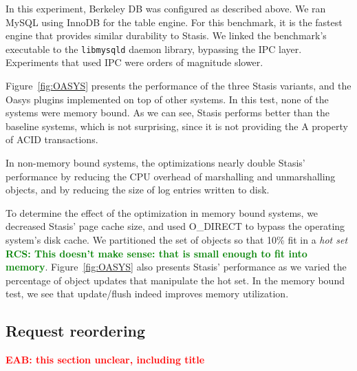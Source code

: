 \documentclass[letterpaper,twocolumn,10pt]{article}
\newcommand{\yad}{Stasis\xspace}
\newcommand{\yads}{Stasis'\xspace}
\newcommand{\oasys}{Oasys\xspace}
\newcommand{\eab}[1]{\textcolor{red}{\bf EAB: #1}}
\newcommand{\rcs}[1]{\textcolor{green}{\bf RCS: #1}}
\begin{document}
In this experiment, Berkeley DB was configured as described above.  We
ran MySQL using InnoDB for the table engine.  For this benchmark, it
is the fastest engine that provides similar durability to \yad. We
linked the benchmark's executable to the {\tt libmysqld} daemon library,
bypassing the IPC layer. Experiments that used IPC were orders of magnitude slower.

Figure~\ref{fig:OASYS} presents the performance of the three \yad
variants, and the \oasys plugins implemented on top of other
systems.  In this test, none of the systems were memory bound.  As
we can see, \yad performs better than the baseline systems, which is
not surprising, since it is not providing the A property of ACID
transactions.

In non-memory bound systems, the optimizations nearly double \yads
performance by reducing the CPU overhead of marshalling and
unmarshalling objects, and by reducing the size of log entries written
to disk.

To determine the effect of the optimization in memory bound systems,
we decreased \yads page cache size, and used O\_DIRECT to bypass the
operating system's disk cache.  We partitioned the set of objects
so that 10\% fit in a {\em hot set} \rcs{This doesn't make sense: that is small enough to fit into
memory}.  Figure~\ref{fig:OASYS} also presents \yads performance as we varied the
percentage of object updates that manipulate the hot set.  In the
memory bound test, we see that update/flush indeed improves memory
utilization.






\subsection{Request reordering}

\eab{this section unclear, including title}
\end{document}
